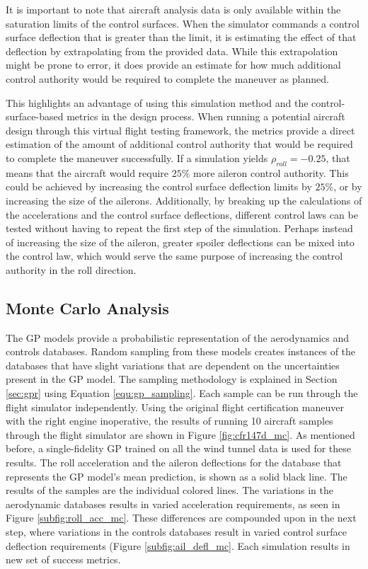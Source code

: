 It is important to note that aircraft analysis data is only available within the saturation limits of the control surfaces. 
When the simulator commands a control surface deflection that is greater than the limit, it is estimating the effect of that deflection by extrapolating from the provided data. 
While this extrapolation might be prone to error, it does provide an estimate for how much additional control authority would be required to complete the maneuver as planned. 

This highlights an advantage of using this simulation method and the control-surface-based metrics in the design process. 
When running a potential aircraft design through this virtual flight testing framework, the metrics provide a direct estimation of the amount of additional control authority that would be required to complete the maneuver successfully. 
If a simulation yields $\rho_{roll} = -0.25$, that means that the aircraft would require $25\%$ more aileron control authority. 
This could be achieved by increasing the control surface deflection limits by $25\%$, or by increasing the size of the ailerons. 
Additionally, by breaking up the calculations of the accelerations and the control surface deflections, different control laws can be tested without having to repeat the first step of the simulation. 
Perhaps instead of increasing the size of the aileron, greater spoiler deflections can be mixed into the control law, which would serve the same purpose of increasing the control authority in the roll direction. 

\subsection{Monte Carlo Analysis}

The GP models provide a probabilistic representation of the aerodynamics and controls databases. 
Random sampling from these models creates instances of the databases that have slight variations that are dependent on the uncertainties present in the GP model.
The sampling methodology is explained in Section \ref{sec:gpr} using Equation \ref{equ:gp_sampling}.
Each sample can be run through the flight simulator independently.
Using the original flight certification maneuver with the right engine inoperative, the results of running 10 aircraft samples through the flight simulator are shown in Figure \ref{fig:cfr147d_mc}.
As mentioned before, a single-fidelity GP trained on all the wind tunnel data is used for these results. 
The roll acceleration and the aileron deflections for the database that represents the GP model's mean prediction, is shown as a solid black line. 
The results of the samples are the individual colored lines. 
The variations in the aerodynamic databases results in varied acceleration requirements, as seen in Figure \ref{subfig:roll_acc_mc}.
These differences are compounded upon in the next step, where variations in the controls databases result in varied control surface deflection requirements (Figure \ref{subfig:ail_defl_mc}.
Each simulation results in new set of success metrics. 

